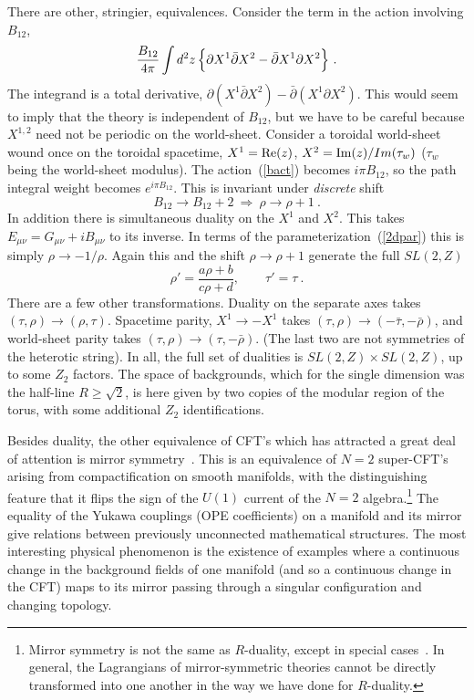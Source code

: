 There are other, stringier, equivalences.  Consider the term in
the action involving $B_{12}$,
\begin{equation}
\frac{B_{12}}{4\pi} \int d^2z\, \Bigl\{ \partial X^1
\bar\partial X^2 - \bar\partial X^1 \partial X^2 \Bigr\} \ .
\label{bact}
\end{equation}
The integrand is a total derivative, $\partial (X^1 \bar\partial
X^2) - \bar\partial (X^1 \partial X^2 )$.  This would seem to
imply that the theory is independent of $B_{12}$, but we have to
be careful because $X^{1,2}$ need not be periodic on the
world-sheet.  Consider a toroidal world-sheet wound once on the
toroidal spacetime, $X^1 = {\rm Re}(z)$, $X^2 = {\rm
Im}(z)/{Im}(\tau_w)$ ($\tau_w$ being the world-sheet modulus).
The action~(\ref{bact}) becomes $i \pi B_{12}$, so the path
integral weight becomes $e^{i \pi B_{12}}$.
This is invariant under {\it discrete} shift
\begin{equation}
B_{12} \to B_{12} + 2 \ \Rightarrow\ \rho \to \rho + 1\ .
\end{equation}
In addition there is simultaneous duality on the $X^1$ and $X^2$.
This takes $E_{\mu\nu} = G_{\mu\nu} + i B_{\mu\nu}$ to
its inverse.  In terms of the parameterization~(\ref{2dpar})
this is simply $\rho \to -1/\rho$.  Again this and the shift
$\rho \to \rho + 1$ generate the full $SL(2,Z)$
\begin{equation}
\rho' = \frac{a \rho + b}{c \rho + d},\qquad \tau' =  \tau\ .
\end{equation}
There are a few other transformations.  Duality on the separate
axes takes $(\tau,\rho) \to (\rho,\tau)$.  Spacetime parity,
$X^1 \to - X^1$ takes $(\tau,\rho) \to (-\bar\tau, -\bar\rho)$,
and world-sheet parity takes $(\tau,\rho) \to (\tau, -\bar\rho)$.
(The last two are not symmetries of the heterotic string).
In all, the full set of dualities is $SL(2,Z) \times SL(2,Z)$,
up to some $Z_2$ factors.  The space of backgrounds,
which for the single dimension was the half-line $R \geq
\sqrt{2}$, is here given by two copies of the modular region of
the torus, with some additional $Z_2$ identifications.

Besides duality, the other equivalence of CFT's which has
attracted a great deal of attention is mirror symmetry~\cite{stY}. 
This is an equivalence of $N=2$ super-CFT's arising from
compactification on smooth manifolds, with the
distinguishing feature that it flips the sign of the
$U(1)$ current of the $N=2$ algebra.\footnote {Mirror symmetry is
not the same as
$R$-duality, except in special cases~\cite{GivW}.  In general, the
Lagrangians of mirror-symmetric theories cannot be directly
transformed into one another in the way we have done for
$R$-duality.}  The equality of the Yukawa couplings (OPE
coefficients) on a manifold and its mirror give relations between
previously unconnected mathematical structures.  The most
interesting physical phenomenon is the existence of examples where
a continuous change in the background fields of one manifold
(and so a continuous change in the CFT)
maps to its mirror passing through a singular configuration and
changing topology.

